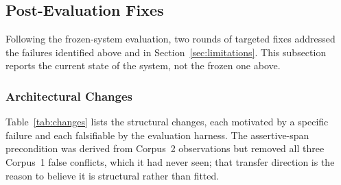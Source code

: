 \documentclass[conference]{IEEEtran}
\begin{document}
\subsection{Post-Evaluation Fixes}
\label{sec:post_eval_fixes}

Following the frozen-system evaluation, two rounds of targeted fixes
addressed the failures identified above and in
Section~\ref{sec:limitations}. This subsection reports the current state
of the system, not the frozen one above.

\subsubsection{Architectural Changes}

Table~\ref{tab:changes} lists the structural changes, each motivated by a
specific failure and each falsifiable by the evaluation harness. The
assertive-span precondition was derived from Corpus~2 observations but
removed all three Corpus~1 false conflicts, which it had never seen; that
transfer direction is the reason to believe it is structural rather than
fitted.
\end{document}
